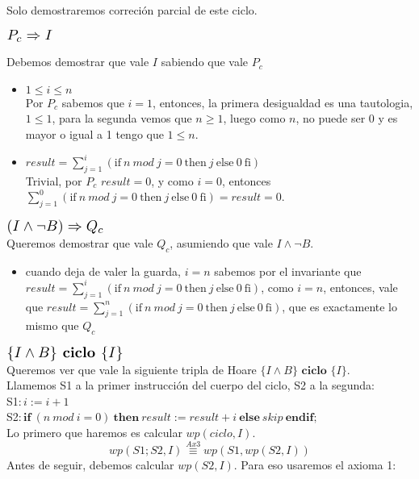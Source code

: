 \documentclass{article}
\begin{document}
\begin{enumerate}[label=\alph*)]
	Solo demostraremos correción parcial de este ciclo.
	\begin{flushleft}$\scalebox{1.3}{$P_c\Rightarrow I$}$\end{flushleft}
	Debemos demostrar que vale $I$ sabiendo que vale $P_c$ 
	\begin{itemize}
		\item $ 1\leq i\leq n$\smallskip \\
		Por $P_c$ sabemos que $i=1$, entonces, la primera desigualdad es una tautologia,
		$1\leq 1$, para la segunda vemos que $n\geq 1$, luego como 
		$n$, no puede ser 0 y es mayor o igual a 1 tengo que $1\leq n$.
		\item  $result=\sum_{j=1}^{i}(\textrm{if}\ n\ mod\ j=0\ \textrm{then}\ j\ \textrm{else}\ 0\ \textrm{fi})$\\
		Trivial, por $P_c$ $result=0$, y  como $i=0$, entonces
		 $\sum_{j=1}^{0}(\textrm{if}\ n\ mod\ j=0\ \textrm{then}\ j\ \textrm{else}\ 0\ \textrm{fi})=result=0$.
	\end{itemize}	 
	$\scalebox{1.3}{$(I\wedge \neg B)\Rightarrow Q_c$}$\smallskip \\
	Queremos demostrar que vale $Q_c$, asumiendo que vale  $I\wedge \neg B$.
	\begin{itemize}
	\item cuando deja de valer la guarda, $i=n$ sabemos por el invariante que $result=\sum_{j=1}^{i}(\textrm{if}\ n\ mod\ j=0\ \textrm{then}\ j\ \textrm{else}\ 0\ \textrm{fi})$, como $i=n$, entonces,
	vale que $result=\sum_{j=1}^{n}(\textrm{if}\ n\ mod\ j=0\ \textrm{then}\ j\ \textrm{else}\ 0\ \textrm{fi})$, que es exactamente lo mismo que $Q_c$
	\end{itemize}
	$\scalebox{1.3}{$\{I\wedge B\} \textbf{ ciclo } \{I\}$}$\medskip \\
	Queremos ver que vale la siguiente tripla de Hoare $\{I\wedge B\} \textbf{ ciclo } \{I\}$.\\
	Llamemos S1 a la primer instrucción del cuerpo del ciclo, S2 a la segunda:\\
	S1$: i:=i+1$\\
	S2$: \textbf{if}\ (n\ mod\ i=0)\ \textbf{then}\ result:=result+i\ \textbf{else}\ skip\ \textbf{endif};$\\
	Lo primero que haremos es calcular $wp(ciclo,I)$.
	\begin{equation}wp(S1;S2,I)\stackrel{Ax3}{\equiv}wp(S1,wp(S2,I))\end{equation}
	Antes de seguir, debemos calcular $wp(S2,I)$. Para eso usaremos el axioma 1:
	\begin{align*}

\end{align*}
\end{enumerate}
\end{document}
